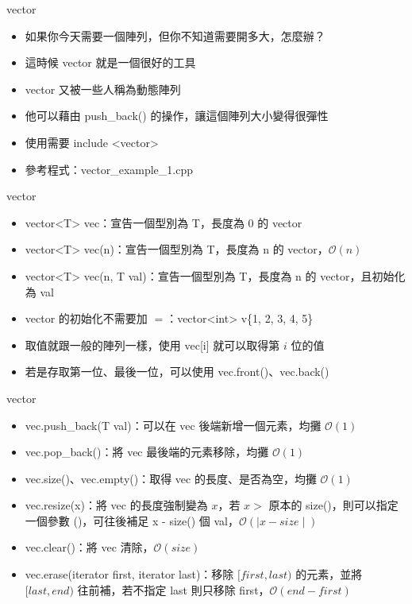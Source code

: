 \documentclass[aspectratio=169]{beamer}
\begin{document}
    \begin{frame}{vector}
        \begin{itemize}
            \item<1-> 如果你今天需要一個陣列，但你不知道需要開多大，怎麼辦？
            \item<2-> 這時候 vector 就是一個很好的工具
            \item<2-> vector 又被一些人稱為動態陣列
            \item<3-> 他可以藉由 push\_back() 的操作，讓這個陣列大小變得很彈性
            \item<4-> 使用需要 include <vector>
            \item<4-> 參考程式：vector\_example\_1.cpp
        \end{itemize}
    \end{frame}
    
    \begin{frame}{vector}
        \begin{itemize}
            \item<1-> vector<T> vec：宣告一個型別為 T，長度為 0 的 vector
            \item<1-> vector<T> vec(n)：宣告一個型別為 T，長度為 n 的 vector，$\mathcal{O}(n)$
            \item<1-> vector<T> vec(n, T val)：宣告一個型別為 T，長度為 n 的 vector，且初始化為 val
            \item<2-> vector 的初始化不需要加 $=$：vector<int> v\{1, 2, 3, 4, 5\}
            \item<3-> 取值就跟一般的陣列一樣，使用 vec[i] 就可以取得第 $i$ 位的值
            \item<3-> 若是存取第一位、最後一位，可以使用 vec.front()、vec.back()
        \end{itemize}
    \end{frame}

    \begin{frame}{vector}
        \begin{itemize}
            \item<1-> vec.push\_back(T val)：可以在 vec 後端新增一個元素，均攤 $\mathcal{O}(1)$
            \item<1-> vec.pop\_back()：將 vec 最後端的元素移除，均攤 $\mathcal{O}(1)$
            \item<2-> vec.size()、vec.empty()：取得 vec 的長度、是否為空，均攤 $\mathcal{O}(1)$
            \item<3-> vec.resize(x)：將 vec 的長度強制變為 $x$，若 $x >$ 原本的 size()，則可以指定一個參數 ()，可往後補足 x - size() 個 val，$\mathcal{O}(\mid x - size \mid)$
            \item<4-> vec.clear()：將 vec 清除，$\mathcal{O}(size)$
            \item<5-> vec.erase(iterator first, iterator last)：移除 $[first, last)$ 的元素，並將 $[last, end)$ 往前補，若不指定 last 則只移除 first，$\mathcal{O}(end-first)$
        \end{itemize}
    \end{frame}
\end{document}
